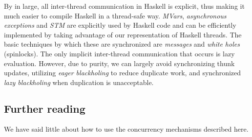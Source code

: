 By in large, all inter-thread communication in Haskell is explicit, thus
making it much easier to compile Haskell in a thread-safe way.
\emph{MVars}, \emph{asynchronous exceptions} and \emph{STM} are
explicitly used by Haskell code and can be efficiently implemented by
taking advantage of our representation of Haskell threads.  The basic
techniques by which these are synchronized are \emph{messages} and
\emph{white holes} (spinlocks).  The only implicit inter-thread
communication that occurs is lazy evaluation.  However, due to purity,
we can largely avoid synchronizing thunk updates, utilizing \emph{eager
blackholing} to reduce duplicate work, and synchronized \emph{lazy
blackholing} when duplication is unacceptable.

\subsection{Further reading}

We have said little about how to use the concurrency mechanisms described here. \XXX
